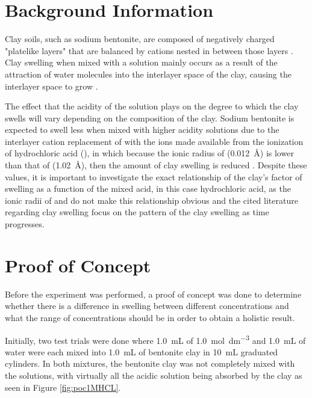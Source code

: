 \documentclass[11pt, letterpaper]{article}
\begin{document}
\section{Background Information}

Clay soils, such as sodium bentonite, are composed of negatively charged
"platelike layers" that are balanced by cations nested in between
those layers \cite{chenClaySwellingRole2022}. Clay swelling when mixed with a solution mainly occurs
as a result of the attraction of water molecules into the interlayer space
of the clay, causing the interlayer space to grow \cite{chenClaySwellingRole2022}.

The effect that the acidity of the solution plays on the degree to which
the clay swells will vary depending on the composition of the clay.
Sodium bentonite is expected to swell less when mixed with higher acidity
solutions due to the interlayer cation replacement
of  with the  ions made available from
the ionization of hydrochloric acid (), in which because the
ionic radius of  (\SI{0.012}{\angstrom})
is lower than that of  (\SI{1.02}{\angstrom}),
then the amount of clay swelling is reduced \cite{ramavaraprasadSwellingCharacteristicsSoils2018a}.
Despite these values, it is important to investigate the exact relationship
of the clay's factor of swelling as a function of the mixed acid,
in this case hydrochloric acid, as the ionic radii of 
and  do not make this relationship obvious and
the cited literature regarding clay swelling focus on the
pattern of the clay swelling as time progresses.


\section{Proof of Concept}

Before the experiment was performed, a proof of concept
was done to determine whether there is a difference
in swelling between different concentrations and what the
range of concentrations should be in order to obtain
a holistic result.

Initially, two test trials were done where \SI{1.0}{mL} of
\SI{1.0}{mol.dm^{-3}}  and \SI{1.0}{mL} of water
were each mixed into \SI{1.0}{mL} of bentonite clay in
\SI{10}{mL} graduated cylinders. In both mixtures, the
bentonite clay was not completely mixed with the solutions,
with virtually all the acidic solution being absorbed by the
clay as seen in Figure \ref*{fig:poc1MHCL}.
\end{document}
